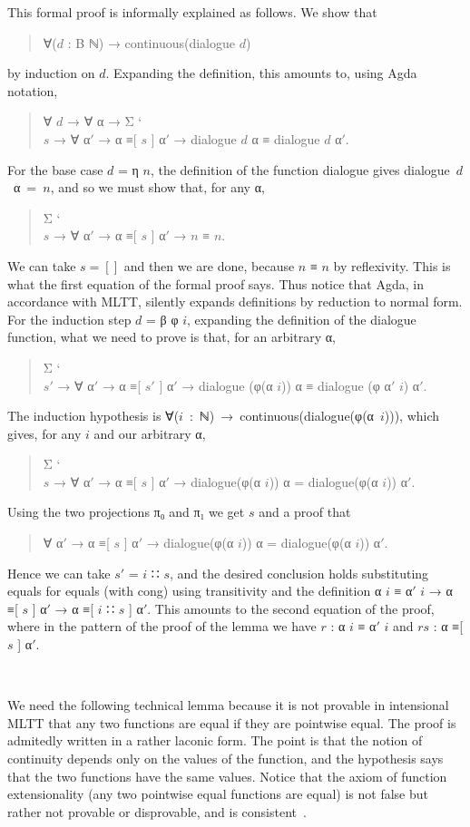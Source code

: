 \documentclass{entcs} \usepackage{prentcsmacro}
\newcommand{\AgdaC}[1]{\mbox{#1}}
\begin{document}
\noindent This formal proof is informally explained as follows. We show that  
\begin{quote}
  ∀($d$ : B ℕ) → continuous(dialogue $d$)
\end{quote}
by induction on $d$. Expanding the definition,
this amounts to,  using Agda notation,
\begin{quote}
  ∀ $d$ → ∀ α → Σ \char`\\$s$ → ∀ α$'$ → α ≡[ $s$ ] α$'$ → dialogue $d$ α ≡ dialogue $d$ α$'$.
\end{quote}
For the base case $d$ = η $n$, the definition of the function dialogue gives \AgdaC{dialogue $d$ α = $n$}, and so we must show that, for any α, 
\begin{quote}
  Σ \char`\\$s$ → ∀ α$'$ → α ≡[ $s$ ] α$'$ → $n$ ≡ $n$.
\end{quote}
We can take $s = []$ and then we are done, because $n$ ≡ $n$ by reflexivity. 
This is what the first equation of the formal proof says. 
Thus notice that Agda, in accordance with MLTT, silently expands definitions by reduction to normal form.
For the induction step $d$ = β φ $i$, expanding the definition of the dialogue function, what we need to prove is that, for an arbitrary α, 
\begin{quote}
  Σ \char`\\$s'$ → ∀ α$'$ → α ≡[ $s'$ ] α$'$ → dialogue (φ(α $i$)) α ≡ dialogue (φ α$'$ $i$) α$'$.
\end{quote}
The induction hypothesis is \AgdaC{∀($i$ : ℕ) → continuous(dialogue(φ(α $i$)))},
which gives, for any $i$ and our arbitrary α,
\begin{quote}
Σ \char`\\$s$ → ∀ α$'$ → α ≡[ $s$ ] α$'$ → dialogue(φ(α $i$)) α = dialogue(φ(α $i$)) α$'$.
\end{quote}
Using the two projections π₀ and π₁ we get $s$ and a proof that
\begin{quote}
∀ α$'$ → α ≡[ $s$ ] α$'$ → dialogue(φ(α $i$)) α = dialogue(φ(α $i$)) α$'$.
\end{quote}
Hence we can take $s'$ = $i$ ∷ $s$, and the desired conclusion holds
substituting equals for equals (with cong) using transitivity and the
definition α $i$ ≡ α$'$ $i$ → α ≡[ $s$ ] α$'$ → α ≡[ $i$ ∷ $s$ ]
α$'$. This amounts to the second equation of the proof, where in the
pattern of the proof of the lemma we have $r$ : α $i$ ≡ α$'$ $i$ and
$rs$ : α ≡[ $s$ ] α$'$.

~

We need the following technical lemma because it is not provable in
intensional MLTT that any two functions are equal if they are
pointwise equal. The proof is admitedly written in a rather
laconic form. The point is that the notion of continuity depends only
on the values of the function, and the hypothesis says that the two
functions have the same values. Notice that the axiom of function
extensionality (any two pointwise equal functions are equal) is not
false but rather not provable or disprovable, and is consistent~\cite{HoTTbook}.
\end{document}
